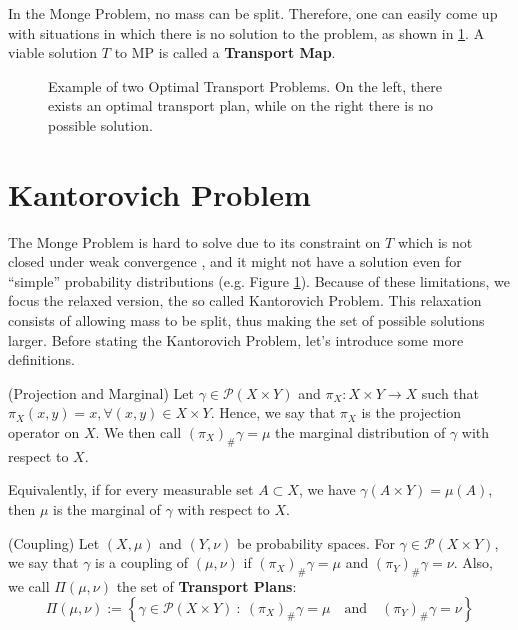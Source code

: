 In the Monge Problem, no mass can be split. Therefore, one can easily
come up with situations in which there is no solution to the problem,
as shown in \ref{fig:monge_map_example}. A viable solution $T$ to MP
is called a \textbf{Transport Map}.
\begin{figure}[H]
  \centering
  \def\svgscale{0.8}
  
  \caption{Example of two Optimal Transport Problems. On the left, there exists an optimal transport
    plan, while on the right there is no possible solution.}
  \label{fig:monge_map_example}
\end{figure}

\section{Kantorovich Problem}

The Monge Problem is hard to solve due to its constraint
on $T$ which is not closed under weak convergence \citep{santambrogio2015optimal}, and
it might not have a solution even for ``simple'' probability distributions
(e.g. Figure \ref{fig:monge_map_example}). Because of these limitations,
we focus the relaxed version, the so called 
Kantorovich Problem. This relaxation consists of allowing mass to be
split, thus making the set of possible solutions larger.
Before stating the Kantorovich Problem, let's
introduce some more definitions.


\begin{definition}(Projection and Marginal)
  Let $\gamma \in \mathcal P(X\times Y)$ and $\pi_X: X \times Y \to X$
  such that $\pi_X(x,y) = x, \forall (x,y) \in X\times Y$. Hence,
  we say that $\pi_X$ is the projection operator on $X$. We then call
  $(\pi_X)_\#\gamma = \mu$ the marginal distribution of $\gamma$ with
  respect to $X$.

  Equivalently, if for every measurable set $A \subset X$, we have
  $\gamma(A\times Y) = \mu(A)$, then $\mu$ is the marginal of $\gamma$
  with respect to $X$.

\end{definition}

\begin{definition} (Coupling)
  Let $(X,\mu)$ and $(Y,\nu)$ be probability spaces. For
  $\gamma \in \mathcal{P}(X\times Y)$, we say that $\gamma$
  is a coupling of $(\mu,\nu)$ if $(\pi_X)_\# \gamma = \mu$
  and $(\pi_Y)_\# \gamma = \nu$. Also, we call $\Pi(\mu,\nu)$
  the set of \textbf{Transport Plans}:
  \begin{equation}
    \Pi(\mu,\nu) :=
    \left \{
    \gamma \in \mathcal{P}(X \times Y) \ :
    \ (\pi_X)_\# \gamma = \mu \quad
    \text{and} \quad
    (\pi_Y)_\# \gamma = \nu
    \right \}
  \end{equation}
\end{definition}

